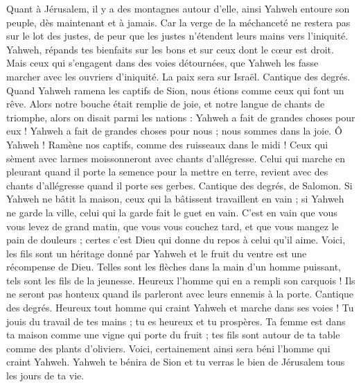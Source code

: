\begin{multicols}{2}
Quant à Jérusalem, il y a des montagnes autour d'elle, ainsi Yahweh entoure son peuple, dès maintenant et à jamais.
Car la verge de la méchanceté ne restera pas sur le lot des justes, de peur que les justes n'étendent leurs mains vers l'iniquité.
Yahweh, répands tes bienfaits sur les bons et sur ceux dont le cœur est droit.
Mais ceux qui s'engagent dans des voies détournées, que Yahweh les fasse marcher avec les ouvriers d'iniquité. La paix sera sur Israël.
\VerseOne{}Cantique des degrés. Quand Yahweh ramena les captifs de Sion, nous étions comme ceux qui font un rêve.
Alors notre bouche était remplie de joie, et notre langue de chants de triomphe, alors on disait parmi les nations : Yahweh a fait de grandes choses pour eux !
Yahweh a fait de grandes choses pour nous ; nous sommes dans la joie.
Ô Yahweh ! Ramène nos captifs, comme des ruisseaux dans le midi !
Ceux qui sèment avec larmes moissonneront avec chants d'allégresse.
Celui qui marche en pleurant quand il porte la semence pour la mettre en terre, revient avec des chants d'allégresse quand il porte ses gerbes.
\VerseOne{}Cantique des degrés, de Salomon. Si Yahweh ne bâtit la maison, ceux qui la bâtissent travaillent en vain ; si Yahweh ne garde la ville, celui qui la garde fait le guet en vain.
C'est en vain que vous vous levez de grand matin, que vous vous couchez tard, et que vous mangez le pain de douleurs ; certes c'est Dieu qui donne du repos à celui qu'il aime.
Voici, les fils sont un héritage donné par Yahweh et le fruit du ventre est une récompense de Dieu.
Telles sont les flèches dans la main d'un homme puissant, tels sont les fils de la jeunesse.
Heureux l'homme qui en a rempli son carquois ! Ils ne seront pas honteux quand ils parleront avec leurs ennemis à la porte.
\VerseOne{}Cantique des degrés. Heureux tout homme qui craint Yahweh et marche dans ses voies !
Tu jouis du travail de tes mains ; tu es heureux et tu prospères.
Ta femme est dans ta maison comme une vigne qui porte du fruit ; tes fils sont autour de ta table comme des plants d'oliviers.
Voici, certainement ainsi sera béni l'homme qui craint Yahweh.
Yahweh te bénira de Sion et tu verras le bien de Jérusalem tous les jours de ta vie.

\end{multicols}
